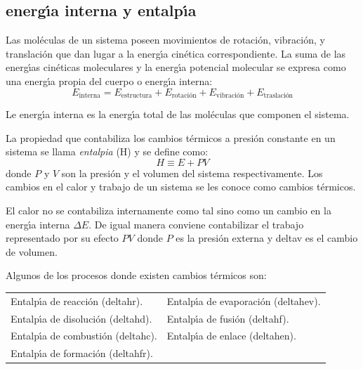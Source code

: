\subsection{energ\'{\i}a interna y entalp\'{\i}a}

Las mol\'eculas de un sistema poseen movimientos de rotaci\'on, vibraci\'on,
y translaci\'on que dan lugar a la energ\'{\i}a cin\'etica correspondiente.
La suma de las energ\'{\i}as cin\'eticas moleculares y la energ\'{\i}a
potencial molecular se expresa como una energ\'{\i}a propia del cuerpo o energ\'{\i}a interna:
\begin{equation}
E_\textrm{interna}=E_\textrm{estructura}+E_\textrm{rotaci\'on}+E_\textrm{vibraci\'on}+E_\textrm{traslaci\'on}
\end{equation}

Le energ\'{\i}a interna es la energ\'{\i}a total de las mol\'eculas que componen el sistema.

 La propiedad que contabiliza los cambios t\'ermicos a presi\'on constante en un sistema se
llama \textit{\gls{entalpia}} (\gls{H})  y se define
como:
\begin{equation}
H \equiv  E + PV
\end{equation}
donde $P$ y $V$ son la presi\'on y el volumen del sistema respectivamente. Los
cambios en el calor y trabajo de un sistema se les conoce como cambios t\'er\-mi\-cos.


El calor no se contabiliza internamente como tal sino como un cambio en la energ\'{\i}a interna $\Delta E$. De igual manera conviene
contabilizar el trabajo representado por su efecto $PV$ donde $P$ es
la presi\'on externa y  \gls{deltav} es el cambio de volumen.

Algunos de los procesos donde existen cambios t\'ermicos son:

\begin{center}
\begin{tabular}{ll}
Entalp\'{\i}a de reacci\'on (\gls{deltahr}).  & Entalp\'{\i}a de evaporaci\'on (\gls{deltahev}).\\
Entalp\'{\i}a de disoluci\'on (\gls{deltahd}). &Entalp\'{\i}a de fusi\'on (\gls{deltahf}). \\
Entalp\'{\i}a de combusti\'on (\gls{deltahc}). &  Entalp\'{\i}a de enlace (\gls{deltahen}).\\
Entalp\'{\i}a de formaci\'on (\gls{deltahfr}). &
\end{tabular}
\end{center}


